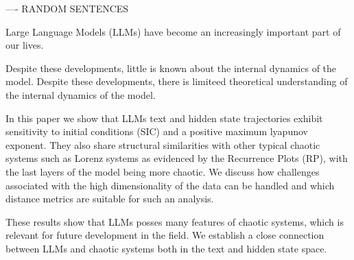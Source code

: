 




---- RANDOM SENTENCES

Large Language Models (LLMs) have become an increasingly important part of our lives.

Despite these developments, little is known about the internal dynamics of the model.
Despite these developments, there is limiteed theoretical understanding of the internal dynamics of the model.




In this paper we show that LLMs text and hidden state trajectories exhibit sensitivity to initial conditions (SIC) and a positive maximum lyapunov exponent. They also share structural similarities with other typical chaotic systems such as Lorenz systems as evidenced by the Recurrence Plots (RP), with the last layers of the model being more chaotic. We discuss how challenges associated with the high dimensionality of the data can be handled and which distance metrics are suitable for such an analysis.

These results show that LLMs posses many features of chaotic systems, which is relevant for future development in the field.
We establish a close connection between LLMs and chaotic systems both in the text and hidden state space.


